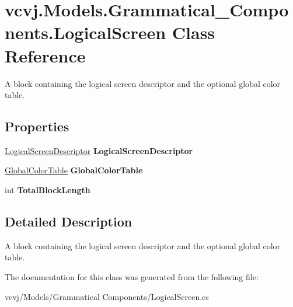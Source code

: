 \hypertarget{classvcvj_1_1_models_1_1_grammatical___components_1_1_logical_screen}{}\section{vcvj.\+Models.\+Grammatical\+\_\+\+Components.\+Logical\+Screen Class Reference}
\label{classvcvj_1_1_models_1_1_grammatical___components_1_1_logical_screen}


A block containing the logical screen descriptor and the optional global color table.  


\subsection*{Properties}
\begin{DoxyCompactItemize}
\item 
\hyperlink{classvcvj_1_1_models_1_1_grammatical___subcomponents_1_1_logical_screen_descriptor}{Logical\+Screen\+Descriptor} {\bfseries Logical\+Screen\+Descriptor}\hypertarget{classvcvj_1_1_models_1_1_grammatical___components_1_1_logical_screen_a07dbc50b82ef62ebf583d1d8be22a466}{}\label{classvcvj_1_1_models_1_1_grammatical___components_1_1_logical_screen_a07dbc50b82ef62ebf583d1d8be22a466}

\item 
\hyperlink{classvcvj_1_1_models_1_1_grammatical___subcomponents_1_1_global_color_table}{Global\+Color\+Table} {\bfseries Global\+Color\+Table}\hypertarget{classvcvj_1_1_models_1_1_grammatical___components_1_1_logical_screen_aa51f46460d3ed264e94ff44d0a62547b}{}\label{classvcvj_1_1_models_1_1_grammatical___components_1_1_logical_screen_aa51f46460d3ed264e94ff44d0a62547b}

\item 
int {\bfseries Total\+Block\+Length}\hypertarget{classvcvj_1_1_models_1_1_grammatical___components_1_1_logical_screen_a12dd15d4faa29fbf148b70055e843373}{}\label{classvcvj_1_1_models_1_1_grammatical___components_1_1_logical_screen_a12dd15d4faa29fbf148b70055e843373}

\end{DoxyCompactItemize}


\subsection{Detailed Description}
A block containing the logical screen descriptor and the optional global color table. 



The documentation for this class was generated from the following file\+:\begin{DoxyCompactItemize}
\item 
vcvj/\+Models/\+Grammatical Components/Logical\+Screen.\+cs\end{DoxyCompactItemize}
